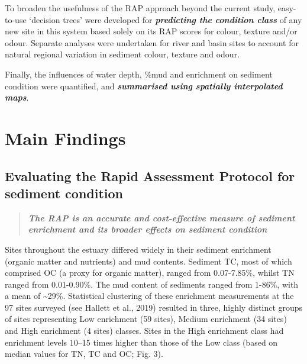 \documentclass[
]{book}
\begin{document}
To broaden the usefulness of the RAP approach beyond the current study, easy-to-use `decision trees' were developed for \textbf{\emph{predicting the condition class}} of any new site in this system based solely on its RAP scores for colour, texture and/or odour. Separate analyses were undertaken for river and basin sites to account for natural regional variation in sediment colour, texture and odour.

Finally, the influences of water depth, \%mud and enrichment on sediment condition were quantified, and \textbf{\emph{summarised using spatially interpolated maps}}.

\hypertarget{main-findings-3}{%
\section{Main Findings}\label{main-findings-3}}

\hypertarget{evaluating-the-rapid-assessment-protocol-for-sediment-condition}{%
\subsection{Evaluating the Rapid Assessment Protocol for sediment condition}\label{evaluating-the-rapid-assessment-protocol-for-sediment-condition}}

\begin{quote}
\textbf{\emph{The RAP is an accurate and cost-effective measure of sediment enrichment and its broader effects on sediment condition}}
\end{quote}

Sites throughout the estuary differed widely in their sediment enrichment (organic matter and nutrients) and mud contents. Sediment TC, most of which comprised OC (a proxy for organic matter), ranged from 0.07-7.85\%, whilst TN ranged from 0.01-0.90\%. The mud content of sediments ranged from 1-86\%, with a mean of \textasciitilde29\%. Statistical clustering of these enrichment measurements at the 97 sites surveyed (see Hallett et al., 2019) resulted in three, highly distinct groups of sites representing Low enrichment (59 sites), Medium enrichment (34 sites) and High enrichment (4 sites) classes. Sites in the High enrichment class had enrichment levels 10--15 times higher than those of the Low class (based on median values for TN, TC and OC; Fig. 3).
\end{document}
